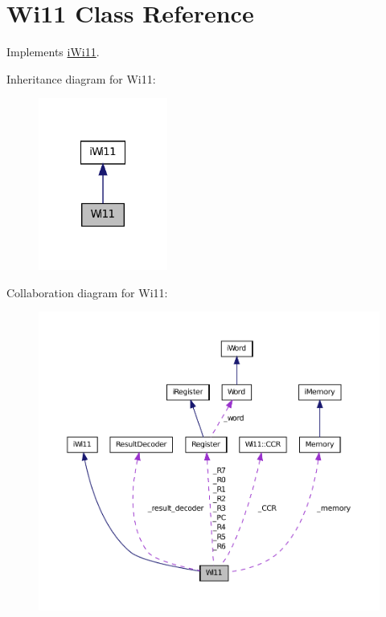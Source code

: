 \hypertarget{classWi11}{
\section{Wi11 Class Reference}
\label{classWi11}
}


Implements \hyperlink{classiWi11}{iWi11}.  




Inheritance diagram for Wi11:
\nopagebreak
\begin{figure}[H]
\begin{center}
\leavevmode
\includegraphics[width=120pt]{classWi11__inherit__graph}
\end{center}
\end{figure}


Collaboration diagram for Wi11:
\nopagebreak
\begin{figure}[H]
\begin{center}
\leavevmode
\includegraphics[width=400pt]{classWi11__coll__graph}
\end{center}
\end{figure}
